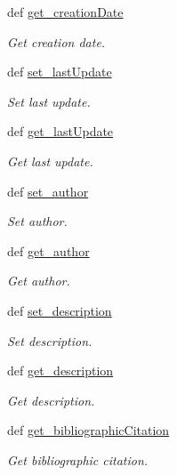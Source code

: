 \begin{DoxyCompactItemize}
def \hyperlink{classlmf_1_1src_1_1core_1_1lexical__resource_1_1_lexical_resource_a2e3bae782878759cdcac67cf6bccd3c8}{get\+\_\+creation\+Date}
\begin{DoxyCompactList}\small\item\em Get creation date. \end{DoxyCompactList}\item 
def \hyperlink{classlmf_1_1src_1_1core_1_1lexical__resource_1_1_lexical_resource_a976816edb5e2825c212372fbf76d8338}{set\+\_\+last\+Update}
\begin{DoxyCompactList}\small\item\em Set last update. \end{DoxyCompactList}\item 
def \hyperlink{classlmf_1_1src_1_1core_1_1lexical__resource_1_1_lexical_resource_a205676f0701ea4ad6f56e055132d98a2}{get\+\_\+last\+Update}
\begin{DoxyCompactList}\small\item\em Get last update. \end{DoxyCompactList}\item 
def \hyperlink{classlmf_1_1src_1_1core_1_1lexical__resource_1_1_lexical_resource_af7c40fb3cc957000b20aa39d9c5e6693}{set\+\_\+author}
\begin{DoxyCompactList}\small\item\em Set author. \end{DoxyCompactList}\item 
def \hyperlink{classlmf_1_1src_1_1core_1_1lexical__resource_1_1_lexical_resource_a2e896e7607f9c71e7db166a652137f87}{get\+\_\+author}
\begin{DoxyCompactList}\small\item\em Get author. \end{DoxyCompactList}\item 
def \hyperlink{classlmf_1_1src_1_1core_1_1lexical__resource_1_1_lexical_resource_a416f746c8212930d4d98059dedc7d4c9}{set\+\_\+description}
\begin{DoxyCompactList}\small\item\em Set description. \end{DoxyCompactList}\item 
def \hyperlink{classlmf_1_1src_1_1core_1_1lexical__resource_1_1_lexical_resource_aa86a440b33cbee8982a3130a9de21319}{get\+\_\+description}
\begin{DoxyCompactList}\small\item\em Get description. \end{DoxyCompactList}\item 
def \hyperlink{classlmf_1_1src_1_1core_1_1lexical__resource_1_1_lexical_resource_ab71215eeb4d9ae9a4d929c899c26a2eb}{get\+\_\+bibliographic\+Citation}
\begin{DoxyCompactList}\small\item\em Get bibliographic citation. \end{DoxyCompactList}\end{DoxyCompactItemize}
